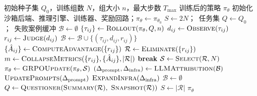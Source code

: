 \begin{algorithm}[htbp]
\caption{自进化强化学习主循环（含失败案例自演化）}
\label{alg:main_loop}
\small
\begin{algorithmic}[1]
\Require 初始种子集 $Q_0$，训练组数 $N$，组大小 $n$，最大步数 $T_{\max}$
\Ensure 训练后的策略 $\pi_\theta$
\State 初始化沙箱后端、推理引擎、训练器、奖励回路；$\pi_\theta \gets \pi_{\theta_0}$
\State $S \gets 2N$；\ 任务集 $Q \gets Q_0$；\ 失败案例缓冲 $\mathcal{B} \gets \emptyset$ 
    \State $\{\tau_{ij}\} \gets \textproc{Rollout}(\pi_\theta, Q, n)$ 
        \State $d_{ij} \gets \textproc{Observe}(\tau_{ij})$ 
        \State $r_{ij} \gets \textproc{Judge}(d_{ij})$ 
         
            \State $\mathcal{B} \gets \mathcal{B} \cup \{(\tau_{ij}, d_{ij}, r_{ij})\}$ 
        \EndIf
    \EndFor
    \State $\{\hat{A}_{ij}\} \gets \textproc{ComputeAdvantage}(\{r_{ij}\})$ 
    \State $\mathcal{R} \gets \textproc{Eliminate}(\{r_{ij}\})$ 
    \State $m \gets \textproc{CollapseMetrics}(\{r_{ij}\}, \{\hat{A}_{ij}\}, |\mathcal{R}|)$ 
     
        \State \textbf{break}
    \EndIf
    \State $\mathcal{S} \gets \textproc{Select}(\mathcal{R}, N)$ 
    \State $\pi_\theta \gets \textproc{GRPOUpdate}(\pi_\theta, \mathcal{S})$ 
     
        \State $(\Delta_{\text{prompt}}, \Delta_{\text{infra}}) \gets \textproc{LLMAttribution}(\mathcal{B})$ 
        \State $\textproc{UpdatePrompts}(\Delta_{\text{prompt}})$ 
        \State $\textproc{ExpandInfra}(\Delta_{\text{infra}})$ 
        \State $\mathcal{B} \gets \emptyset$ 
    \EndIf
    \State $Q \gets \textproc{Questioner}(\textproc{Summary}(\mathcal{R}),\ \textproc{Snapshot}(\mathcal{R}))$ 
    \State $S \gets |\mathcal{R}|$ 
\EndFor
\State \Return $\pi_\theta$
\end{algorithmic}
\end{algorithm}

